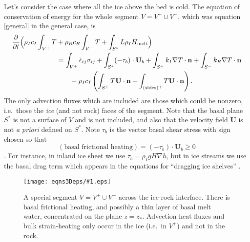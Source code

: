 \documentclass[12pt,final]{amsart}%
\theoremstyle{plain}
\theoremstyle{definition}
\theoremstyle{remark}
\newcommand{\regfigure}[2]{\texttt{[image: eqns3Deps/\#1.eps]}}
\newcommand{\ddt}[1]{\ensuremath{\frac{\partial #1}{\partial t}}}
\def\eps{\epsilon}
\newcommand{\grad}{\nabla}
\newcommand{\nhat}{\mathbf{n}}
\newcommand{\bU}{{\mathbf{U}}}
\begin{document}
Let's consider the case where all the ice above the bed is cold.  The equation of conservation of energy for the whole segment $V=V^+\cup V^-$, which was equation \eqref{general} in the general case, is
\begin{align}
\ddt{}\Big(\rho_I c_I \int_{V^+} T &+ \rho_R c_R \int_{V^-} T + \int_{S^\ast} L \rho_I H_{\text{melt}}\Big) \label{acrossINTERFACE} \\
    &= \int_{V^+} \dot \eps_{ij} \sigma_{ij} + \int_{S^\ast} (-\tau_b) \cdot \bU_b + \int_{S^+} k_I \grad T \cdot \nhat + \int_{S^-} k_R \grad T \cdot \nhat \notag\\
    &\qquad - \rho_I c_I\left(\int_{S^+} T \bU\cdot \nhat + \int_{(\text{sides})^+} T \bU\cdot \nhat\right).\notag
\end{align}
The only advection fluxes which are included are those which could be nonzero, i.e.~those the \emph{ice} (and not rock) faces of the segment.  Note that the basal plane $S^\ast$ is not a surface of $V$ and is not included, and also that the velocity field $\bU$ is not \emph{a priori} defined on $S^\ast$.  Note $\tau_b$ is the vector basal shear stress with sign chosen so that
    $$(\text{basal frictional heating}) = (-\tau_b)\cdot \bU_b \ge 0$$
\citep[chapter 10]{Paterson}.  For instance, in inland ice sheet we use $\tau_b = \rho_I g H \grad h$, but in ice streams we use the basal drag term which appears in the equations for ``dragging ice shelves'' \citep[i.e.~the equations from][]{MacAyeal}.

\begin{figure}[ht]
\regfigure{interfacesegment}{3.5}
\vspace{-0.1in}
\caption{A special segment $V=V^+\cup V^-$ across the ice-rock interface.  There is basal frictional heating, and possibly a thin layer of basal melt water, concentrated on the plane $z=z_\ast$.  Advection heat fluxes and bulk strain-heating only occur in the ice (i.e.~in $V^+$) and not in the rock.}
\label{fig:segINTERFACE}
\vspace{-0.1in}
\end{figure}
\end{document}
